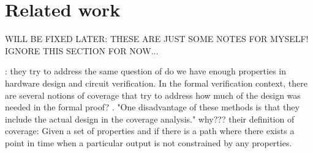 \section{Related work}
\label{sec:related}
WILL BE FIXED LATER: THESE ARE JUST SOME NOTES FOR MYSELF!\\IGNORE THIS SECTION FOR NOW...

\cite{claessen2007coverage}:
they try to address the same question of do we have enough properties in hardware design and circuit verification.
In the formal verification context, there are several notions of coverage that try to address how much of the design was needed in the formal proof? \cite{chockler2006coverage, chockler_coverage_2003, katz1999have, grosse2007estimating}.
 "One disadvantage of these methods is that they
include the actual design in the coverage analysis." why???
their definition of coverage: Given a set of properties and if there is a path where there exists a point in time when a particular output is not constrained by any properties.

